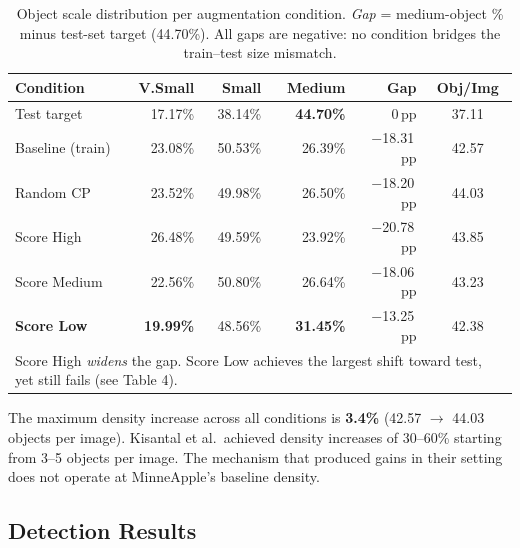 \documentclass[10pt, a4paper]{article}
\begin{document}
\begin{table}[H]
\centering
\small
\caption{Object scale distribution per augmentation condition.
  \emph{Gap} = medium-object \% minus test-set target (44.70\%).
  All gaps are negative: no condition bridges the train--test size mismatch.}
\begin{tabular}{lrrrrc}
\toprule
\textbf{Condition} & \textbf{V.Small} & \textbf{Small}
  & \textbf{Medium} & \textbf{Gap} & \textbf{Obj/Img} \\
\midrule
Test target       & 17.17\% & 38.14\% & \textbf{44.70\%}
  & 0\,pp & 37.11 \\
\midrule
Baseline (train)  & 23.08\% & 50.53\% & 26.39\% & $-$18.31\,pp & 42.57 \\
Random CP         & 23.52\% & 49.98\% & 26.50\% & $-$18.20\,pp & 44.03 \\
Score High        & 26.48\% & 49.59\% & 23.92\% & $-$20.78\,pp & 43.85 \\
Score Medium      & 22.56\% & 50.80\% & 26.64\% & $-$18.06\,pp & 43.23 \\
\textbf{Score Low}& \textbf{19.99\%} & 48.56\% & \textbf{31.45\%}
  & $-$13.25\,pp & 42.38 \\
\bottomrule
\multicolumn{6}{l}{\small Score High \emph{widens} the gap.
  Score Low achieves the largest shift toward test, yet still fails (see Table 4).}
\end{tabular}
\end{table}

The maximum density increase across all conditions is \textbf{3.4\%}
(42.57 $\to$ 44.03 objects per image).
Kisantal et al.\ achieved density increases of 30--60\% starting from
3--5 objects per image.
The mechanism that produced gains in their setting does not operate
at MinneApple's baseline density.

\subsection{Detection Results}
\end{document}
